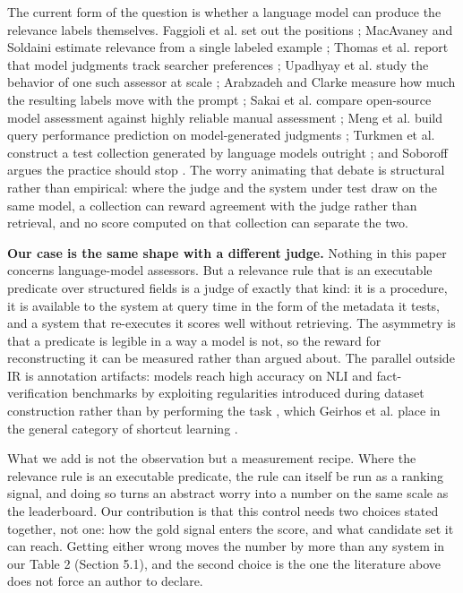\documentclass[acmsmall]{acmart}
\begin{document}
The current form of the question is whether a language model can produce the relevance labels themselves. Faggioli et al. set out the positions \cite{faggioli2023perspectives}; MacAvaney and Soldaini estimate relevance from a single labeled example \cite{macavaney2023oneshot}; Thomas et al. report that model judgments track searcher preferences \cite{thomas2024preferences}; Upadhyay et al. study the behavior of one such assessor at scale \cite{upadhyay2025umbrela}; Arabzadeh and Clarke measure how much the resulting labels move with the prompt \cite{arabzadeh2025prompt}; Sakai et al. compare open-source model assessment against highly reliable manual assessment \cite{sakai2025opensource}; Meng et al. build query performance prediction on model-generated judgments \cite{meng2025qpp}; Turkmen et al. construct a test collection generated by language models outright \cite{turkmen2026gentrec}; and Soboroff argues the practice should stop \cite{soboroff2025dontuse}. The worry animating that debate is structural rather than empirical: where the judge and the system under test draw on the same model, a collection can reward agreement with the judge rather than retrieval, and no score computed on that collection can separate the two.

\textbf{Our case is the same shape with a different judge.} Nothing in this paper concerns language-model assessors. But a relevance rule that is an executable predicate over structured fields is a judge of exactly that kind: it is a procedure, it is available to the system at query time in the form of the metadata it tests, and a system that re-executes it scores well without retrieving. The asymmetry is that a predicate is legible in a way a model is not, so the reward for reconstructing it can be measured rather than argued about. The parallel outside IR is annotation artifacts: models reach high accuracy on NLI and fact-verification benchmarks by exploiting regularities introduced during dataset construction rather than by performing the task \cite{gururangan2018artifacts,schuster2019fever}, which Geirhos et al. place in the general category of shortcut learning \cite{geirhos2020shortcut}.

What we add is not the observation but a measurement recipe. Where the relevance rule is an executable predicate, the rule can itself be run as a ranking signal, and doing so turns an abstract worry into a number on the same scale as the leaderboard. Our contribution is that this control needs two choices stated together, not one: how the gold signal enters the score, and what candidate set it can reach. Getting either wrong moves the number by more than any system in our Table 2 (Section 5.1), and the second choice is the one the literature above does not force an author to declare.
\end{document}
